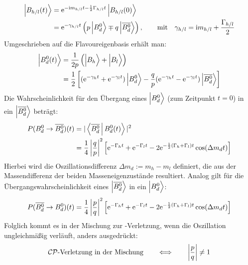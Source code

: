 \begin{align}
\nonumber \Ket{B_{h/l}(t)\vphantom{\text{\Bdbar}}} &= \e^{-\im m_{h/l}t-\frac{1}{2}\Gamma_{h/l}t}\Ket{B_{h/l}(0)\vphantom{\text{\Bdbar}}} \\
                           &= \e^{-\gamma_{h/l}t}\left(p\Ket{\text{\Bd}\vphantom{\text{\Bdbar}}} \mp q\Ket{\text{\Bdbar}}\right), \qquad
 \text{mit} \quad \gamma_{h/l} = \im m_{h/l}+\frac{\Gamma_{h/l}}{2}
\end{align}
Umgeschrieben auf die Flavoureigenbasis erhält man:
\begin{align}
\nonumber \Ket{\text{\Bd}(t)\vphantom{\text{\Bdbar}}} &= \frac{1}{2p}\left(\Ket{B_h\vphantom{\text{\Bdbar}}} + \Ket{B_l\vphantom{\text{\Bdbar}}}\right) \\
                       &= \frac{1}{2}\left[ (\e^{-\gamma_h t}+\e^{-\gamma_l t})\Ket{\text{\Bd}\vphantom{\text{\Bdbar}}} - \frac{q}{p}(\e^{-\gamma_h t}-\e^{-\gamma_l t})\Ket{\text{\Bdbar}}\right] \label{eg:b(t)}
\end{align}
Die Wahrscheinlichkeit für den Übergang eines $\Ket{\text{\Bd}\vphantom{\text{\Bdbar}}}$ (zum Zeitpunkt $t=0$) in ein $\Ket{\text{$\overline{B_d^0}$}}$ beträgt:
\begin{align}
\nonumber P(\text{$B_d^0$}\rightarrow\text{$\overline{B_d^0}$})(t) &= |\Braket{\text{$\overline{B_d^0}$}|\text{$B_d^0$}(t)}|^2 \\
                                        &= \frac{1}{4} \left|\frac{q}{p}\right|^2 \left[\mathrm{e}^{-\Gamma_h t} + \mathrm{e}^{-\Gamma_l t} - 2\mathrm{e}^{-\frac{1}{2}(\Gamma_h + \Gamma_l) t}\cos(\Delta m_d t)\right]
\end{align}
Hierbei wird die Oszillationsdifferenz $\Delta m_d := m_h - m_l$ definiert, die aus der Massendifferenz der beiden Masseneigenzustände resultiert. Analog gilt für die Übergangswahrscheinlichkeit eines $\Ket{\text{$\overline{B_d^0}$}}$ in ein $\Ket{\text{\Bd}\vphantom{\text{\Bdbar}}}$:
\begin{align}
P(\text{$\overline{B_d^0}$}\rightarrow \text{$B_d^0$})(t) = \frac{1}{4} \left|\frac{p}{q}\right|^2 \left[\mathrm{e}^{-\Gamma_h t} + \mathrm{e}^{-\Gamma_l t} - 2\mathrm{e}^{-\frac{1}{2}(\Gamma_h + \Gamma_l) t}\cos(\Delta m_d t)\right] 
\end{align}
Folglich kommt es in der Mischung zur \CP-Verletzung, wenn die Oszillation ungleichmäßig verläuft, anders ausgedrückt:
\begin{align}
\text{$\mathcal{CP}$-Verletzung in der Mischung} \qquad \Longleftrightarrow \qquad \left|\frac{p}{q}\right| \neq 1 
\end{align}

